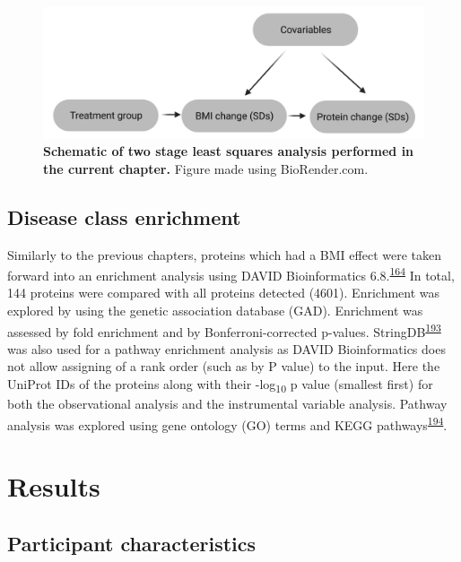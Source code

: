 \documentclass[11pt,twoside]{bristolthesis}
\begin{document}
\begin{figure}

{\centering \includegraphics{figure/DiRECT/DiRECT_analysis} 

}

\caption[Schematic of two stage least squares analysis performed using DiRECT data]{\textbf{Schematic of two stage least squares analysis performed in the current chapter.} Figure made using BioRender.com.}\label{fig:direct-tsls}
\end{figure}
\hypertarget{disease-class-enrichment}{%
\subsection{Disease class enrichment}\label{disease-class-enrichment}}

Similarly to the previous chapters, proteins which had a BMI effect were taken forward into an enrichment analysis using DAVID Bioinformatics 6.8.\textsuperscript{\protect\hyperlink{ref-Huang2009}{164}} In total, 144 proteins were compared with all proteins detected (4601). Enrichment was explored by using the genetic association database (GAD). Enrichment was assessed by fold enrichment and by Bonferroni-corrected p-values. StringDB\textsuperscript{\protect\hyperlink{ref-Szklarczyk2021}{193}} was also used for a pathway enrichment analysis as DAVID Bioinformatics does not allow assigning of a rank order (such as by P value) to the input. Here the UniProt IDs of the proteins along with their -log\textsubscript{10} p value (smallest first) for both the observational analysis and the instrumental variable analysis. Pathway analysis was explored using gene ontology (GO) terms and KEGG pathways\textsuperscript{\protect\hyperlink{ref-Kanehisa2016}{194}}.

\hypertarget{results-4}{%
\section{Results}\label{results-4}}

\hypertarget{participant-characteristics-2}{%
\subsection{Participant characteristics}\label{participant-characteristics-2}}
\end{document}
